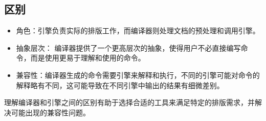 \subsection*{区别}
\begin{itemize}
\item 角色：引擎负责实际的排版工作，而编译器则处理文档的预处理和调用引擎。
\item 抽象层次： 编译器提供了一个更高层次的抽象，使得用户不必直接编写命令，而是使用更易于理解和使用的命令。
\item 兼容性：编译器生成的命令需要引擎来解释和执行，不同的引擎可能对命令的解释略有不同，这可能导致在不同引擎中输出的结果有细微差别。
\end{itemize}

理解编译器和引擎之间的区别有助于选择合适的工具来满足特定的排版需求，并解决可能出现的兼容性问题。
